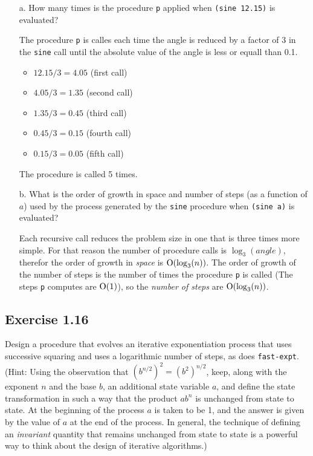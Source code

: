 \documentclass[letterpaper, leqno]{article}
\begin{document}
\begin{itemize}
\item[a.] How many times is the procedure \texttt{p} applied when \texttt{(sine 12.15)} is evaluated?

  \textcolor{answer}{The procedure \texttt{p} is calles each time the angle is reduced by a factor of 3 in the \texttt{sine} call until the absolute value of the angle is less or equall than 0.1.}

\textcolor{answer}{  
  \begin{itemize}
    \item $12.15/3 = 4.05$ (first call)
    \item $4.05/3 = 1.35$ (second call)
    \item $1.35/3 = 0.45$ (third call)
    \item $0.45/3 = 0.15$ (fourth call)
    \item $0.15/3 = 0.05$ (fifth call)
  \end{itemize}
}

\textcolor{answer}{
The procedure is called 5 times.}

\item[b.] What is the order of growth in space and number of steps (as a function of $a$) used by the process generated by the \texttt{sine} procedure when \texttt{(sine a)} is evaluated?

\textcolor{answer}{
  Each recursive call reduces the problem size in one that is three times more simple. For that reason the number of procedure calls is $\log_3(angle)$, therefor the order of growth in \textit{space} is $\textrm O(\log_3(n))$. The order of growth of the number of steps is the number of times the procedure \texttt{p} is called (The steps \texttt{p} computes are $\textrm O(1)$), so the \textit{number of steps} are $\textrm O(\log_3(n))$.}
\end{itemize}

\subsection*{Exercise 1.16}
Design a procedure that evolves an iterative exponentiation process that uses successive squaring and uses a logarithmic number of steps, as does \texttt{fast-expt}. (Hint: Using the observation that $(b^{n/2})^2 = (b^2)^{n/2}$, keep, along with the exponent $n$ and the base $b$, an additional state variable $a$, and define the state transformation in such a way that the product $ab^n$ is unchanged from state to state. At the beginning of the process $a$ is taken to be 1, and the answer is given by the value of $a$ at the end of the process. In general, the technique of defining an \textit{invariant} quantity that remains unchanged from state to state is a powerful way to think about the design of iterative algorithms.)
\end{document}
